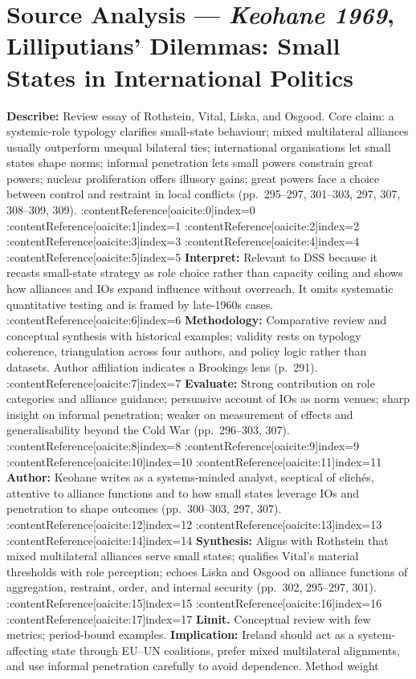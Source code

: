 \section*{Source Analysis — \textit{Keohane 1969}, Lilliputians' Dilemmas: Small States in International Politics}
\textbf{Describe:} Review essay of Rothstein, Vital, Liska, and Osgood. Core claim: a systemic-role typology clarifies small-state behaviour; mixed multilateral alliances usually outperform unequal bilateral ties; international organisations let small states shape norms; informal penetration lets small powers constrain great powers; nuclear proliferation offers illusory gains; great powers face a choice between control and restraint in local conflicts (pp.~295–297, 301–303, 297, 307, 308–309, 309). :contentReference[oaicite:0]{index=0} :contentReference[oaicite:1]{index=1} :contentReference[oaicite:2]{index=2} :contentReference[oaicite:3]{index=3} :contentReference[oaicite:4]{index=4} :contentReference[oaicite:5]{index=5}
\textbf{Interpret:} Relevant to DSS because it recasts small-state strategy as role choice rather than capacity ceiling and shows how alliances and IOs expand influence without overreach. It omits systematic quantitative testing and is framed by late-1960s cases. :contentReference[oaicite:6]{index=6}
\textbf{Methodology:} Comparative review and conceptual synthesis with historical examples; validity rests on typology coherence, triangulation across four authors, and policy logic rather than datasets. Author affiliation indicates a Brookings lens (p.~291). :contentReference[oaicite:7]{index=7}
\textbf{Evaluate:} Strong contribution on role categories and alliance guidance; persuasive account of IOs as norm venues; sharp insight on informal penetration; weaker on measurement of effects and generalisability beyond the Cold War (pp.~296–303, 307). :contentReference[oaicite:8]{index=8} :contentReference[oaicite:9]{index=9} :contentReference[oaicite:10]{index=10} :contentReference[oaicite:11]{index=11}
\textbf{Author:} Keohane writes as a systems-minded analyst, sceptical of clichés, attentive to alliance functions and to how small states leverage IOs and penetration to shape outcomes (pp.~300–303, 297, 307). :contentReference[oaicite:12]{index=12} :contentReference[oaicite:13]{index=13} :contentReference[oaicite:14]{index=14}
\textbf{Synthesis:} Aligns with Rothstein that mixed multilateral alliances serve small states; qualifies Vital’s material thresholds with role perception; echoes Liska and Osgood on alliance functions of aggregation, restraint, order, and internal security (pp.~302, 295–297, 301). :contentReference[oaicite:15]{index=15} :contentReference[oaicite:16]{index=16} :contentReference[oaicite:17]{index=17}
\textbf{Limit.} Conceptual review with few metrics; period-bound examples. 
\textbf{Implication:} Ireland should act as a system-affecting state through EU–UN coalitions, prefer mixed multilateral alignments, and use informal penetration carefully to avoid dependence.
Method weight

